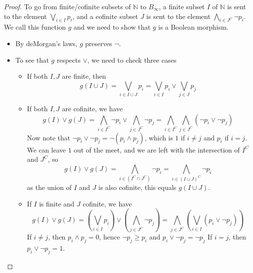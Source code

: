 \documentclass{../util/zariski-small}
\begin{document}
\begin{example}
\begin{proof}
  To go from finite/cofinite subsets of $\mathbb N$ to $B_\infty$,
  a finite subset $I$ of $\mathbb N$ is sent to the element 
  $\bigvee_{i \in I} p_i$, and a cofinite subset $J$ is sent to the element 
  $\bigwedge_{i \in J^C} \neg p_i$.  
  We call this function $g$ and we need to show that $g$ is a Boolean morphism. 
  \begin{itemize}
    \item By deMorgan's laws, $g$ preserves $\neg$. 
    \item To see that $g$ respects $\vee$, we need to check three cases
      \begin{itemize}
        \item If both $I,J$ are finite, then 
        \begin{equation} 
          g(I \cup J) = \bigvee_{i\in I \cup J} p_i= \bigvee_{i\in I} p_i \vee \bigvee_{j\in J} p_j 
        \end{equation}
      \item If both $I,J$ are cofinite, we have
        \begin{equation}
          g(I) \vee g(J) = 
          \bigwedge_{i \in I^C} \neg p_i \vee 
          \bigwedge_{j \in J^C} \neg p_j 
          = 
          \bigwedge_{i\in I^C} 
          \bigwedge_{j \in J^C}(\neg p_i \vee  \neg p_j) 
        \end{equation}
        Now note that $\neg p_i \vee \neg p_j = \neg ( p_i \wedge p_j)$, which 
        is $1$ if $i \neq j$ and $p_i$ if $i =j$. 
        We can leave $1$ out of the meet, and we are left with the intersection of $I^C$ and $J^C$, so
        \begin{equation}
          g(I) \vee g(J) = 
          \bigwedge_{i \in (I^C \cap J^C)} \neg p_i
          = 
          \bigwedge_{i \in (I \cup J)^C} \neg p_i 
        \end{equation} 
        as the union of $I$ and $J$ is also cofinite, this equals 
          $ g( I \cup J)$. 
        \item If $I$ is finite and $J$ cofinite, we have 
        \begin{equation}
        g(I) \vee g(J) = (\bigvee_{i\in I} p_i) \vee (\bigwedge_{j \in J^C} \neg p_j)
        = \bigwedge_{j \in J^C} (\bigvee_{i \in I}( p_i \vee \neg p_j))
        \end{equation}
        If $i\neq j$, then $p_i\wedge p_j = 0$, hence $\neg p_j \geq p_i$ and $p_i \vee \neg p_j  = \neg p_j$
        If $i = j$, then $p_i \vee \neg p_j = 1$.

\end{itemize}
\end{itemize}
\end{proof}
\end{example}
\end{document}
